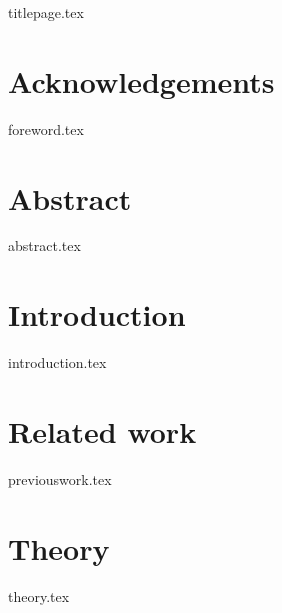 \documentclass[12pt, a4paper]{report}
\begin{document}
{titlepage.tex}

\chapter*{Acknowledgements}
{foreword.tex}
\afterpage{\blankpage}

\chapter*{Abstract}
{abstract.tex}
\afterpage{\blankpage}

\tableofcontents
\newpage
\afterpage{\blankpage}

\chapter{Introduction}
{introduction.tex}

\chapter{Related work}
{previouswork.tex}

\chapter{Theory}
{theory.tex}

\end{document}
